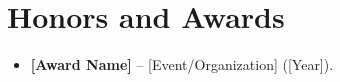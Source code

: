 \documentclass[11pt,letterpaper,sans]{moderncv}
\begin{document}
\section{Honors and Awards}
\vspace{1pt}
\begin{itemize}
\item{\textbf{[Award Name]} -- [Event/Organization] ([Year]).}
\end{itemize}

\end{document}
